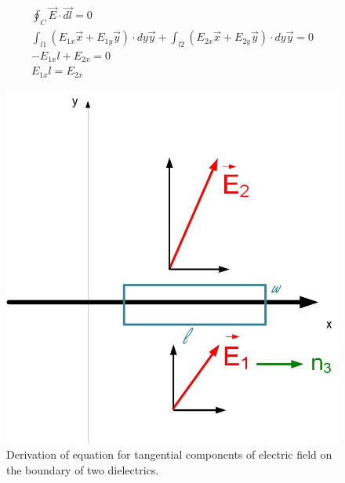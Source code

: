 \documentclass{ximera}
\begin{document}
\begin{eqnarray}
\oint_C \vec{E} \cdot \vec{dl}=0 \\
\int_{l1} (E_{1x} \vec{x}+E_{1y} \vec{y}) \cdot dy \vec{y} +\int_{l2} (E_{2x} \vec{x}+E_{2y} \vec{y}) \cdot dy \vec{y} =0 \\
-E_{1x} l + E_{2x} = 0 \\
E_{1x} l = E_{2x}
\end{eqnarray}


\begin{figure}[htbp]
\begin{center}
\includegraphics[scale=0.5]{../jpg/BoundaryConditionsTang.jpg}
\end{center}
\caption{Derivation of equation for tangential components of electric field on the boundary of two dielectrics.}
\label{fig:BoundaryConditionTangential}
\end{figure}
\end{document}
